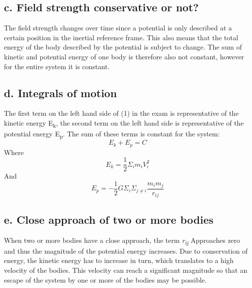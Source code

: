 \subsection{c. Field strength conservative or not?}
The field strength changes over time since a potential is only described at a certain position in the inertial reference frame. This also means that the total energy of the body described by the potential is subject to change. The sum of kinetic and potential energy of one body is therefore also not constant, however for the entire system it is constant.
\subsection{d. Integrals of motion}
The first term on the left hand side of (1) in the exam is representative of the kinetic energy E\textsubscript k, the second term on the left hand side is representative of the potential energy E\textsubscript p. The sum of these terms is constant for the system:
\begin{equation}
E_k + E_p = C
\label{c}
\end{equation}
Where
\begin{equation}
E_k = \frac{1}{2} \Sigma_i m_i V_i^2
\end{equation}
And
\begin{equation}
E_p = - \frac{1}{2} G \Sigma_i \Sigma_{j \neq i} \frac{m_i m_j}{r_{ij}}
\end{equation}
\subsection{e. Close approach of two or more bodies}
When two or more bodies have a close approach, the term \textit{r\textsubscript{ij}} Approaches zero and thus the magnitude of the potential energy increases. Due to conservation of energy, the kinetic energy has to increase in turn, which translates to a high velocity of the bodies. This velocity can reach a significant magnitude so that an escape of the system by one or more of the bodies may be possible.
